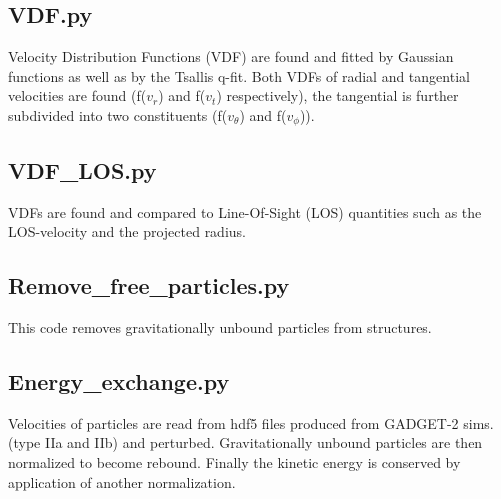 %

\subsection{VDF.py}
Velocity Distribution Functions (VDF) are found and fitted by Gaussian functions as well as by the Tsallis q-fit.
Both VDFs of radial and tangential velocities are found (f($v_r$) and f($v_t$) respectively), the tangential is further subdivided into two constituents (f($v_{\theta}$) and f($v_{\phi}$)).

%

\subsection{VDF\_LOS.py}
VDFs are found and compared to Line-Of-Sight (LOS) quantities such as the LOS-velocity and the projected radius.

%
\subsection{Remove\_free\_particles.py}
This code removes gravitationally unbound particles from structures.

\subsection{Energy\_exchange.py}
Velocities of particles are read from hdf5 files produced from GADGET-2 sims. (type IIa and IIb) and perturbed. Gravitationally unbound particles are then normalized to become rebound. Finally the kinetic energy is conserved by application of another normalization.

%
